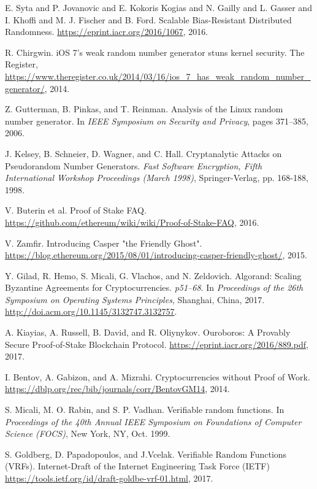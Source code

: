 \documentclass[12pt,a4]{article}
\begin{document}
\begin{thebibliography}{5}

	E. Syta and P. Jovanovic and E. Kokoris Kogias and N. Gailly and L. Gasser and I. Khoffi and M. J. Fischer and B. Ford. Scalable Bias-Resistant Distributed Randomness. \url{https://eprint.iacr.org/2016/1067}, 2016.
	
	R. Chirgwin. iOS 7’s weak random number generator stuns kernel security. The Register, \url{https://www.theregister.co.uk/2014/03/16/ios_7_has_weak_random_number_generator/}, 2014.
	
	Z. Gutterman, B. Pinkas, and T. Reinman. Analysis of the Linux random number generator. In \textit{IEEE Symposium on Security and Privacy}, pages 371–385, 2006.
	
	J. Kelsey, B. Schneier, D. Wagner, and C. Hall. Cryptanalytic Attacks on Pseudorandom Number Generators. \textit{Fast Software Encryption, Fifth International Workshop Proceedings (March 1998)}, Springer-Verlag, pp. 168-188, 1998.
	
	V. Buterin et al. Proof of Stake FAQ. \url{https://github.com/ethereum/wiki/wiki/Proof-of-Stake-FAQ}, 2016.
	
	V. Zamfir. Introducing Casper "the Friendly Ghost". \url{https://blog.ethereum.org/2015/08/01/introducing-casper-friendly-ghost/}, 2015.
		
	Y. Gilad, R. Hemo, S. Micali, G. Vlachos, and N. Zeldovich. Algorand: Scaling Byzantine Agreements for Cryptocurrencies. {\em p51--68}. In {\em Proceedings of the 26th Symposium on Operating Systems Principles}, Shanghai, China, 2017. \url{http://doi.acm.org/10.1145/3132747.3132757}.
	
	A. Kiayias, A. Russell, B. David, and R. Oliynykov. Ouroboros: A Provably Secure Proof-of-Stake Blockchain Protocol. \url{https://eprint.iacr.org/2016/889.pdf}, 2017.
	
	I. Bentov, A. Gabizon, and A. Mizrahi. Cryptocurrencies without Proof of Work. \url{https://dblp.org/rec/bib/journals/corr/BentovGM14}, 2014.
	
	S. Micali, M. O. Rabin, and S. P. Vadhan. Verifiable random functions. In {\em Proceedings of the 40th Annual IEEE Symposium on Foundations of Computer Science (FOCS)}, New York, NY, Oct. 1999.

	S. Goldberg, D. Papadopoulos, and J.Vcelak. Verifiable Random Functions (VRFs). Internet-Draft of the Internet Engineering Task Force (IETF) \url{https://tools.ietf.org/id/draft-goldbe-vrf-01.html}, 2017.


\end{thebibliography}
\end{document}
